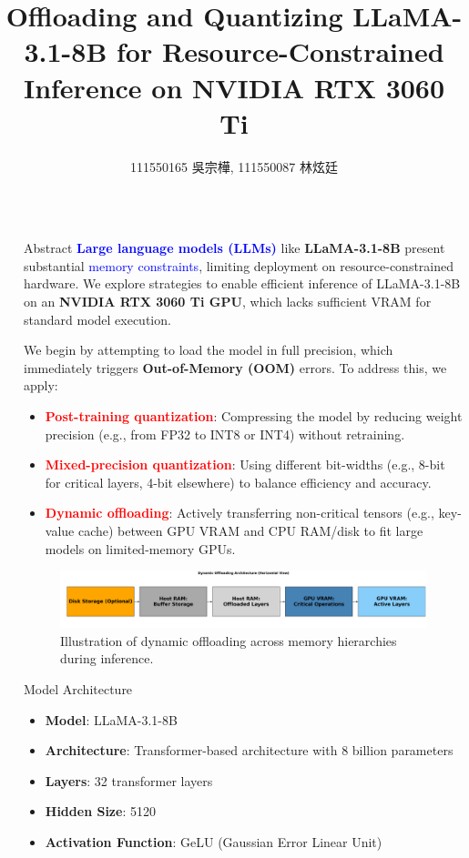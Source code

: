 \documentclass[final]{beamer}
\title{Offloading and Quantizing LLaMA-3.1-8B for Resource-Constrained Inference on NVIDIA RTX 3060 Ti}
\author{111550165 吳宗樺, 111550087 林炫廷}
\newlength{\sepwidth}
\newlength{\colwidth}
\newcommand{\separatorcolumn}{\begin{column}{\sepwidth}\end{column}}
\begin{document}
\begin{frame}[t]
\begin{columns}[t]
 \separatorcolumn

 \begin{column}{\colwidth}
    \begin{block}{Abstract}
      \textbf{\textcolor{blue}{Large language models (LLMs)}} like \textbf{LLaMA-3.1-8B} present substantial \textcolor{blue}{memory constraints}, limiting deployment on resource-constrained hardware. We explore strategies to enable efficient inference of LLaMA-3.1-8B on an \textbf{NVIDIA RTX 3060 Ti GPU}, which lacks sufficient VRAM for standard model execution.

We begin by attempting to load the model in full precision, which immediately triggers \textbf{Out-of-Memory (OOM)} errors. To address this, we apply:

\vspace{-0.5em}
\begin{itemize}
  \item \textbf{\textcolor{red}{Post-training quantization}}: Compressing the model by reducing weight precision (e.g., from FP32 to INT8 or INT4) without retraining.
  \item \textbf{\textcolor{red}{Mixed-precision quantization}}: Using different bit-widths (e.g., 8-bit for critical layers, 4-bit elsewhere) to balance efficiency and accuracy.
  \item \textbf{\textcolor{red}{Dynamic offloading}}: Actively transferring non-critical tensors (e.g., key-value cache) between GPU VRAM and CPU RAM/disk to fit large models on limited-memory GPUs.
\end{itemize}
\vspace{-0.5em}

\begin{figure}
  \centering
  \includegraphics[width=1\colwidth]{dynamic_offloading_architecture.png}
  \caption{Illustration of dynamic offloading across memory hierarchies during inference.}
  \label{fig:llama_model}
\end{figure}
    \end{block}   
    \begin{block}{Model Architecture}
      \begin{itemize}
        \item \textbf{Model}: LLaMA-3.1-8B
        \item \textbf{Architecture}: Transformer-based architecture with 8 billion parameters
        \item \textbf{Layers}: 32 transformer layers
        \item \textbf{Hidden Size}: 5120
        \item \textbf{Activation Function}: GeLU (Gaussian Error Linear Unit)
        

\end{itemize}
\end{block}
\end{column}
\end{columns}
\end{frame}
\end{document}
